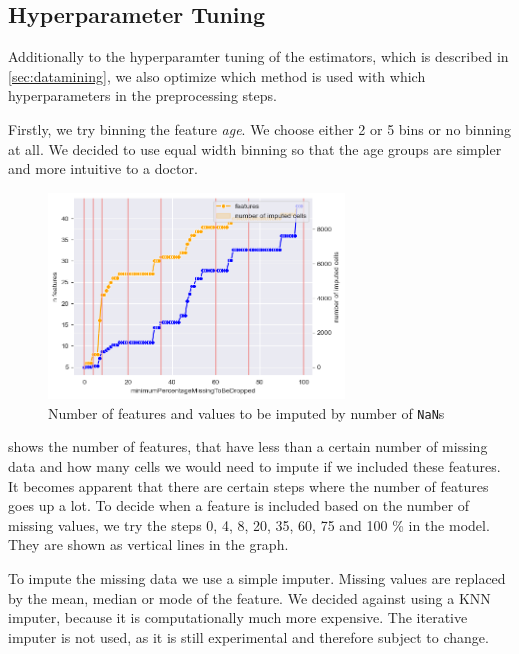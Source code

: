 \subsection{Hyperparameter Tuning} \label{subsec:hyperparametertuning}
Additionally to the hyperparamter tuning of the estimators, which is described in \cref{sec:datamining}, we also optimize which method is used with which hyperparameters in the preprocessing steps.

Firstly, we try binning the feature \emph{age}. We choose either 2 or 5 bins or no binning at all. We decided to use equal width binning so that the age groups are simpler and more intuitive to a doctor.

\begin{figure}[h]
	\centering
	\includegraphics[width=0.7\textwidth]{images/percentageToBeDropped.png}
	\caption{Number of features and values to be imputed by number of \texttt{NaN}s}
	\label{fig:percentageToBeDropped}
\end{figure}

  shows the number of features, that have less than a certain number of missing data and how many cells we would need to impute if we included these features. It becomes apparent that there are certain steps where the number of features goes up a lot. To decide when a feature is included based on the number of missing values, we try the steps 0, 4, 8, 20, 35, 60, 75 and 100 \% in the model. They are shown as vertical lines in the graph. 

To impute the missing data we use a simple imputer. Missing values are replaced by the mean, median or mode of the feature. We decided against using a KNN imputer, because it is computationally much more expensive. The iterative imputer is not used, as it is still experimental and therefore subject to change.

